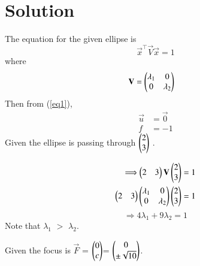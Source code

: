 \documentclass[journal,12pt,twocolumn]{IEEEtran}
\begin{document}
\section{Solution}

The equation for the given ellipse is
\begin{equation}
    \vec{x}^{\top}\vec{V}\vec{x} = 1
\end{equation}
where
\begin{align}
    \mathbf{V} &= \begin{pmatrix}\lambda_1 & 0 \\ 0 & \lambda_2\end{pmatrix}
\end{align}
Then from (\ref{eq1}),
\begin{align}
    \vec{u} &= \vec{0}\\
    f &= -1
\end{align}
Given the ellipse is passing through $\begin{pmatrix}2\\3\end{pmatrix}$ .

\begin{align}
   \Longrightarrow  \begin{pmatrix}2&3\end{pmatrix}\mathbf{V} \begin{pmatrix}2\\3\end{pmatrix}& = 1\\
     \begin{pmatrix}2&3\end{pmatrix}\begin{pmatrix}\lambda_1&0\\0&\lambda_2\end{pmatrix} \begin{pmatrix}2\\3\end{pmatrix}& = 1
\end{align}
\begin{equation}
     \Longrightarrow 4\lambda_1 +9\lambda_2=1 \label{eq:5}
\end{equation}
Note that $\lambda_1$ $>$ $\lambda_2$.

Given the focus is $\vec{F}$ = $\begin{pmatrix}0 \\ c\end{pmatrix}$= $\begin{pmatrix}0 \\ \pm \sqrt{10}\end{pmatrix}$.
\end{document}

